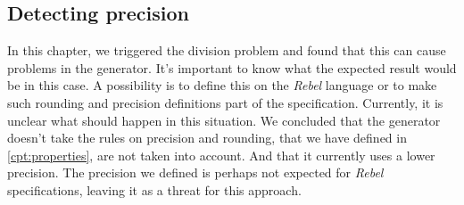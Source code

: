 \subsection*{Detecting precision}
In this chapter, we triggered the division problem and found that this can
cause problems in the generator. It's important to know what the expected result
would be in this case. A possibility is to define this on the \textit{Rebel}
language or to make such rounding and precision definitions part of the
specification. Currently, it is unclear what should happen in this situation. We
concluded that the generator doesn't take the rules on precision and rounding,
that we have defined in \autoref{cpt:properties}, are not taken into account.
And that it currently uses a lower precision. The precision we defined is
perhaps not expected for \textit{Rebel} specifications, leaving it as a threat
for this approach.

